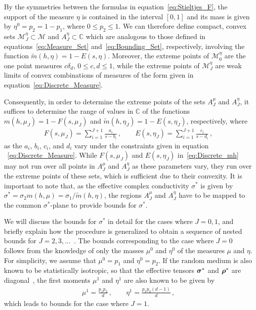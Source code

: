 \documentclass{cmslatex}
\newcommand\bsig{\mbox{\boldmath${\sigma}$}}
\newcommand\brho{\mbox{\boldmath${\rho}$}}
\begin{document}
By the symmetries between the formulas in
equation~\eqref{eq:Stieltjes_F}, the support of the measure $\eta$ is
contained in 
the interval $[0,1]$ and its mass is given by $\eta^0=p_2=1-p_1$, where
$0\leq p_2\leq1$. We can therefore define compact, convex sets
$\mathscr{M}_J^\eta\subset\mathscr{M}$ and $A_J^\eta\subset\mathbb{C}$ which are
analogous to those defined in equations~\eqref{eq:Measure_Set}
and~\eqref{eq:Bounding_Set}, respectively, involving the function 
$\tilde{m}(h,\eta)=1-E(s,\eta)$. Moreover, the extreme points of
$\mathscr{M}_0^\eta$ are the one point measures $c\delta_d$, $0\leq c,d\leq1$, 
while the extreme points of $\mathscr{M}_J^\eta$ are weak limits
of convex combinations of measures of the form given in
equation~\eqref{eq:Discrete_Measure}.  



Consequently, in order to determine the extreme
points of the sets $A_J^\mu$ and $A_J^\eta$, it suffices to determine the
range of values in $\mathbb{C}$ of the functions $m(h,\mu_J)=1-F(s,\mu_J)$
and $\tilde{m}(h,\eta_J)=1-E(s,\eta_J)$, respectively, where  
%
\begin{align}\label{eq:Discrete_mh}
  F(s,\mu_J)=\sum_{i=1}^{J+1}\frac{a_i}{s-b_i}\,, \qquad
  E(s,\eta_J)=\sum_{i=1}^{J+1}\frac{c_i}{s-d_i}\,,
\end{align}
as the $a_i$, $b_i$, $c_i$, and $d_i$ vary under the
constraints given in equation ~\eqref{eq:Discrete_Measure}. While
$F(s,\mu_J)$ and $E(s,\eta_J)$ in~\eqref{eq:Discrete_mh} may not run over
all points in $A_J^\mu$ and 
$A_J^\eta$ as these parameters vary, they run over the
extreme points of these sets, which is sufficient due to their
convexity. It is important to note that, as the effective complex
conductivity $\sigma^*$ is given by $\sigma^*=\sigma_2m(h,\mu)=\sigma_1/\tilde{m}(h,\eta)$, the
regions $A_J^\mu$ and $A_J^\eta$ have to be mapped to the common
$\sigma^*$-plane to provide bounds for $\sigma^*$.    





We will discuss the bounds for $\sigma^*$ in detail for the cases where
$J=0,1$, and briefly explain how the procedure is generalized to
obtain a sequence of nested bounds for
$J=2,3,\ldots$~\cite{Golden:JMPS-333}. The bounds corresponding to the case
where $J=0$ 
follows from the knowledge of only the masses $\mu^0$ and $\eta^0$ of the
measures $\mu$ and $\eta$. For simplicity, we assume that $\mu^0=p_1$ and
$\eta^0=p_2$. If the random medium is also known to be statistically
isotropic, so that the effective tensors $\bsig^*$ and $\brho^*$ are
diagonal~\cite{MILTON:2002:TC}, the first moments $\mu^1$ and $\eta^1$ are
also known to be given by~\cite{Golden:JMPS-333}    
%
\begin{align}\label{eq:First_Moments}
  \mu^1=\frac{p_1p_2}{d}\,, \qquad
  \eta^1=\frac{p_1p_2(d-1)}{d}\,,
\end{align}
%
which leads to bounds for the case where $J=1$.
\end{document}
